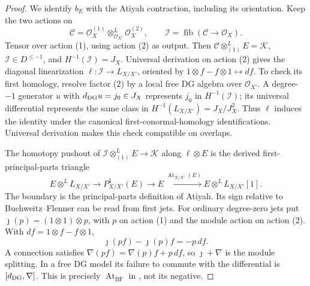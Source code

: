 \documentclass[11pt]{article}
\numberwithin{equation}{section}
\begin{document}
\begin{proof}
We identify \(b_E\) with the Atiyah contraction, including its
orientation.  Keep the two actions on
\[
 \mathcal C=\mathcal O_X^{(1)}
       \otimes^L_{\mathcal O_{X'}}\mathcal O_X^{(2)},\qquad
 \mathcal I=\operatorname{fib}(\mathcal C\to\mathcal O_X).
\]
Tensor over action (1), using action (2) as output.  Then
\(\mathcal C\otimes^L_{(1)}E=\mathcal K\),
\(\mathcal I\in D^{\leq-1}\), and
\(H^{-1}(\mathcal I)=J_X\).
Universal derivation on action (2) gives the diagonal
linearization
\(\ell:\mathcal I\to L_{X/X'}\), oriented by
\(1\otimes f-f\otimes1\mapsto df\).
To check its first homology, resolve factor (2) by a local free
DG algebra over \(\mathcal O_{X'}\).  A degree-\(-1\)
generator \(u\) with \(d_{\rm DG}u=j_0\in J_X\) represents
\(j_0\) in \(H^{-1}(\mathcal I)\); its universal differential
represents the same class in
\(H^{-1}(L_{X/X'})=J_X/J_X^2\).  Thus \(\ell\) induces the
identity under the canonical first-conormal-homology
identifications.  Universal derivation makes this check
compatible on overlaps.

The homotopy pushout of
\(\mathcal I\otimes^L_{(1)}E\to\mathcal K\) along
\(\ell\otimes E\) is the derived first-principal-parts triangle
\[
 E\otimes^L L_{X/X'}\longrightarrow P^1_{X/X'}(E)
 \longrightarrow E
 \xrightarrow{\operatorname{At}_{X/X'}(E)}
 E\otimes^L L_{X/X'}[1].
\]
The boundary is the principal-parts definition of Atiyah.
Its sign relative to Buchweitz--Flenner can be read from first
jets.  For ordinary degree-zero jets put
\(\jmath(p)=(1\otimes1)\otimes p\), with \(p\) on action (1)
and the module action on action (2).  With
\(df=1\otimes f-f\otimes1\),
\[
 \jmath(pf)-\jmath(p)f=-p\,df.
\]
A connection satisfies
\(\nabla(pf)=\nabla(p)f+p\,df\), so
\(\jmath+\nabla\) is the module splitting.  In a free DG model
its failure to commute with the differential is
\([d_{\rm DG},\nabla]\).  This is precisely
\(\operatorname{At}_{\mathrm{BF}}\) in
\cite[Definition~3.4]{P3SWBuchweitzFlenner2003}, not its negative.


\end{proof}
\end{document}
